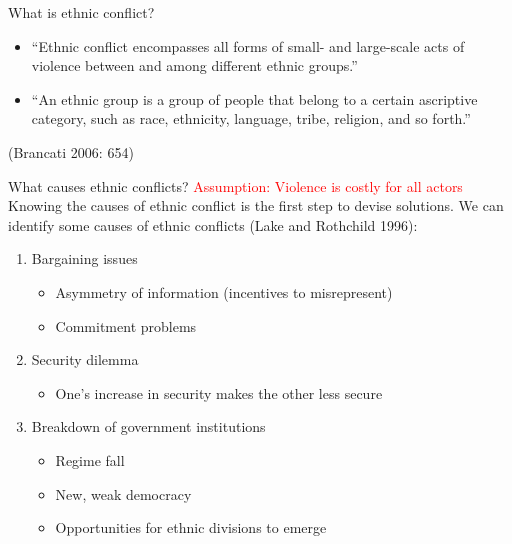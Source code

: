 \documentclass[xcolor=table]{beamer}
\begin{document}
\begin{frame}{What is ethnic conflict?}
\begin{itemize}
\item ``Ethnic conflict encompasses all forms of small- and large-scale acts of violence between and among different ethnic groups.'' \pause
\item ``An ethnic group is a group of people that belong to a certain ascriptive category, such as race, ethnicity, language, tribe, religion, and so forth.''
\end{itemize}
(Brancati 2006: 654)
\end{frame}

\begin{frame}{What causes ethnic conflicts?}
\textcolor{red}{Assumption: Violence is costly for all actors} \\ \pause
Knowing the causes of ethnic conflict is the first step to devise solutions. We can identify some causes of ethnic conflicts (Lake and Rothchild 1996): \pause
\begin{enumerate}
\item Bargaining issues \pause
	\begin{itemize}
	\item Asymmetry of information (incentives to misrepresent) \pause
	\item Commitment problems \pause
	\end{itemize}
\item Security dilemma \pause
	\begin{itemize}
	\item One's increase in security makes the other less secure \pause
	\end{itemize}
\item Breakdown of government institutions \pause
	\begin{itemize}
	\item Regime fall \pause
	\item New, weak democracy \pause
	\item Opportunities for ethnic divisions to emerge
	\end{itemize}
\end{enumerate}
\end{frame}
\end{document}
